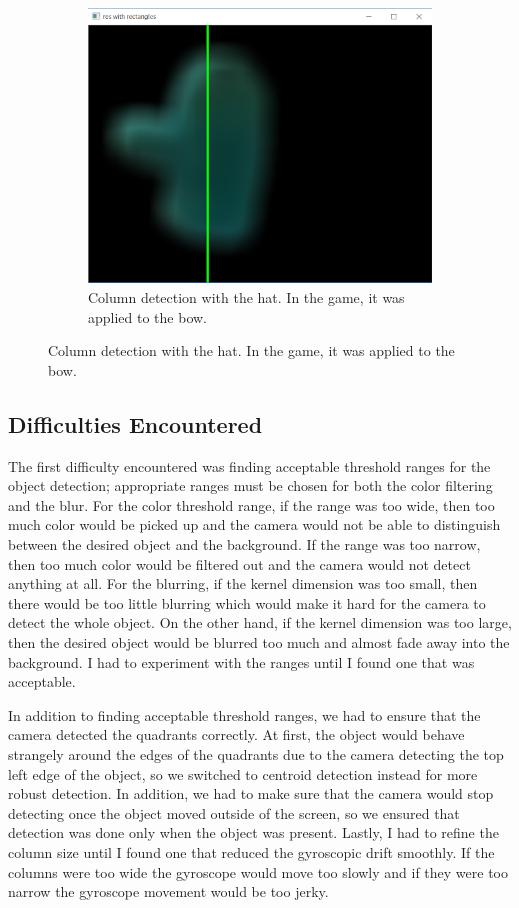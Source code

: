 \documentclass[titlepage, 12pt]{scrartcl}
\begin{document}
\begin{figure}[ht!]
\begin{subfigure}[b]{0.4\linewidth}
            \includegraphics[width=\linewidth]{figures/column.png}
            \caption{Column detection with the hat. In the game, it was applied to the bow.}
        \end{subfigure}
    \end{figure}
    
    \subsection{Difficulties Encountered}
    The first difficulty encountered was finding acceptable threshold ranges for the object detection; appropriate ranges must be chosen for both the color filtering and the blur. For the color threshold range, if the range was too wide, then too much color would be picked up and the camera would not be able to distinguish between the desired object and the background. If the range was too narrow, then too much color would be filtered out and the camera would not detect anything at all. For the blurring, if the kernel dimension was too small, then there would be too little blurring which would make it hard for the camera to detect the whole object. On the other hand, if the kernel dimension was too large, then the desired object would be blurred too much and almost fade away into the background. I had to experiment with the ranges until I found one that was acceptable. \par
    In addition to finding acceptable threshold ranges, we had to ensure that the camera detected the quadrants correctly. At first, the object would behave strangely around the edges of the quadrants due to the camera detecting the top left edge of the object, so we switched to centroid detection instead for more robust detection. In addition, we had to make sure that the camera would stop detecting once the object moved outside of the screen, so we ensured that detection was done only when the object was present.
    Lastly, I had to refine the column size until I found one that reduced the gyroscopic drift smoothly. If the columns were too wide the gyroscope would move too slowly and if they were too narrow the gyroscope movement would be too jerky.
\end{document}
